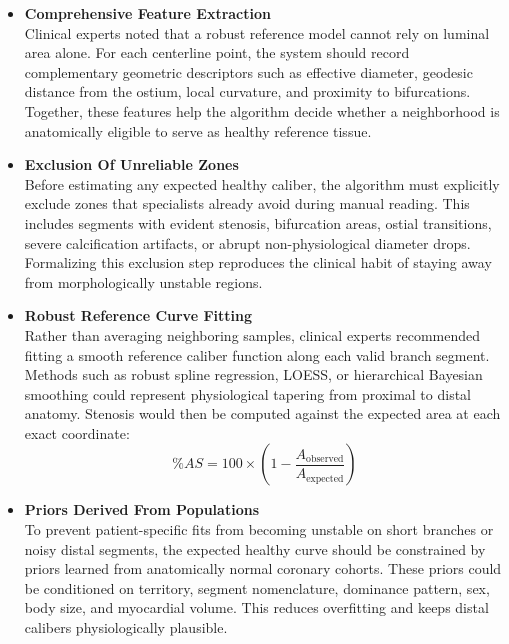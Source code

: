 \begin{itemize}
  \item \textbf{Comprehensive Feature Extraction}\\
  Clinical experts noted that a robust reference model cannot rely on luminal area alone. For each centerline point, the system should record complementary geometric descriptors such as effective diameter, geodesic distance from the ostium, local curvature, and proximity to bifurcations. Together, these features help the algorithm decide whether a neighborhood is anatomically eligible to serve as healthy reference tissue.

  \item \textbf{Exclusion Of Unreliable Zones}\\
  Before estimating any expected healthy caliber, the algorithm must explicitly exclude zones that specialists already avoid during manual reading. This includes segments with evident stenosis, bifurcation areas, ostial transitions, severe calcification artifacts, or abrupt non-physiological diameter drops. Formalizing this exclusion step reproduces the clinical habit of staying away from morphologically unstable regions.

  \item \textbf{Robust Reference Curve Fitting}\\
  Rather than averaging neighboring samples, clinical experts recommended fitting a smooth reference caliber function along each valid branch segment. Methods such as robust spline regression, LOESS, or hierarchical Bayesian smoothing could represent physiological tapering from proximal to distal anatomy. Stenosis would then be computed against the expected area at each exact coordinate:
  \begin{equation}
    \%AS = 100 \times \left(1 - \frac{A_{\mathrm{observed}}}{A_{\mathrm{expected}}}\right)
    \label{eq:expected-healthy-stenosis}
  \end{equation}

  \item \textbf{Priors Derived From Populations}\\
  To prevent patient-specific fits from becoming unstable on short branches or noisy distal segments, the expected healthy curve should be constrained by priors learned from anatomically normal coronary cohorts. These priors could be conditioned on territory, segment nomenclature, dominance pattern, sex, body size, and myocardial volume. This reduces overfitting and keeps distal calibers physiologically plausible.
\end{itemize}

